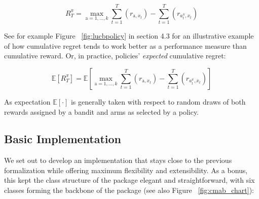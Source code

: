 \documentclass{jss}\usepackage[]{graphicx}\usepackage[]{color}
\begin{document}
\begin{equation} \label{eq:2}
R^{\pi}_{T} = \max_{\mathrm{a} = 1, \dots, k} \sum^{T}_{t=1}(r_{\mathrm{a},x_t}) - \sum^{T}_{t=1}(r_{a^{\pi}_t,x_t})
\end{equation}

See for example Figure ~\ref{fig:lucbpolicy} in section 4.3 for an illustrative example of how cumulative regret tends to work better as a performance measure than cumulative reward. Or, in practice, policies' \textit{expected} cumulative regret:

\begin{equation} \label{eq:3}
\mathbb{E}\left[R^{\pi}_{T} \right] = \mathbb{E}\left[  \max_{\mathrm{a} = 1, \dots, k} \sum^{T}_{t=1}(r_{\mathrm{a},x_t}) - \sum^{T}_{t=1}(r_{a^{\pi}_t,x_t})\right]
\end{equation}

As expectation $\mathbb{E}\left[ \mathord{\cdot}\right]$ is generally taken with respect to random draws of both rewards assigned by a bandit and arms as selected by a policy.

\subsection{Basic Implementation}

We set out to develop an implementation that stays close to the previous formalization while offering maximum flexibility and extensibility. As a bonus, this kept the class structure of the package elegant and straightforward, with six classes forming the backbone of the package (see also Figure ~\ref{fig:cmab_chart}):
\end{document}
